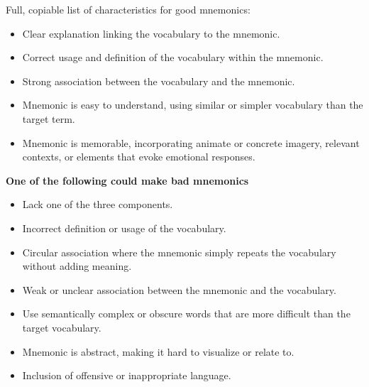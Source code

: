  \label{app:mnemonics}


 \label{app:mnemonic-characteristics}

Full, copiable list of characteristics for good mnemonics:
\begin{itemize}
  \item Clear explanation linking the vocabulary to the mnemonic.
  \item Correct usage and definition of the vocabulary within the mnemonic.
  \item Strong association between the vocabulary and the mnemonic.
  \item Mnemonic is easy to understand, using similar or simpler vocabulary than the target term.
  \item Mnemonic is memorable, incorporating animate or concrete imagery, relevant contexts, or elements that evoke emotional responses.
\end{itemize}

\textbf{One of the following could make bad mnemonics}
\begin{itemize}
  \item Lack one of the three components.
  \item Incorrect definition or usage of the vocabulary.
  \item Circular association where the mnemonic simply repeats the vocabulary without adding meaning.
  \item Weak or unclear association between the mnemonic and the vocabulary.
  \item Use semantically complex or obscure words that are more difficult than the target vocabulary.
  \item Mnemonic is abstract, making it hard to visualize or relate to.
  \item Inclusion of offensive or inappropriate language.
\end{itemize}

 \label{sec:linguistic-features}

